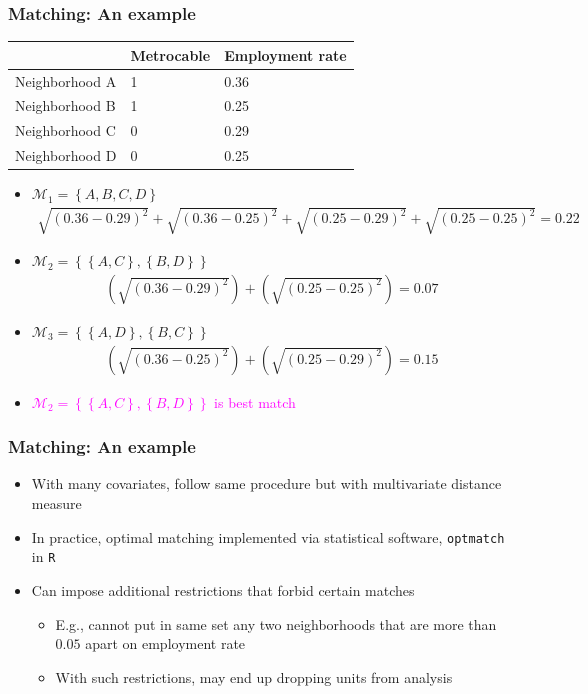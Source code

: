\documentclass[table, xcolor = {dvipsnames}, 9pt]{beamer}
\theoremstyle{plain}
\begin{document}
\begin{frame}[t]
\frametitle{Matching: An example}
\vfill
\begin{table}[H]
\centering
\begin{tabular}{lll}
\hline
& Metrocable & Employment rate \\ \hline
Neighborhood A  & 1  & 0.36 \\
Neighborhood B  & 1  & 0.25 \\
Neighborhood C  & 0  & 0.29 \\
Neighborhood D  & 0  & 0.25 \\
\hline
\end{tabular}
\end{table} \vfill
\begin{itemize}
\item $\mathcal{M}_1 = \left\{A, B, C, D\right\}$ \vfill
\footnotesize
\begin{align*}
\sqrt{\left(0.36 - 0.29\right)^2} + \sqrt{\left(0.36 - 0.25\right)^2} + \sqrt{\left(0.25 - 0.29\right)^2} + \sqrt{\left(0.25 - 0.25\right)^2} = 0.22
\end{align*} \vfill
\normalsize
\item $\mathcal{M}_2 = \left\{\left\{A, C\right\}, \left\{B, D\right\}\right\}$ \vfill
\footnotesize
\begin{align*}
\left(\sqrt{\left(0.36 - 0.29\right)^2}\right) + \left(\sqrt{\left(0.25 - 0.25\right)^2}\right) = 0.07
\end{align*} \vfill
\normalsize
\item $\mathcal{M}_3 = \left\{\left\{A, D\right\}, \left\{B, C\right\} \right\}$ \vfill
\footnotesize
\begin{align*}
\left(\sqrt{\left(0.36 - 0.25\right)^2}\right) + \left(\sqrt{\left(0.25 - 0.29\right)^2}\right) = 0.15
\end{align*} \vfill
\normalsize
\item[] \vfill 
\textcolor{magenta}{$\mathcal{M}_2 = \left\{\left\{A, C\right\}, \left\{B, D\right\}\right\}$ is best match} \vfill
\end{itemize} \vfill
\end{frame}
\begin{frame}[t]
\frametitle{Matching: An example}
\vfill
\begin{itemize}
\item With many covariates, follow same procedure but with multivariate distance measure \vfill
\item In practice, optimal matching implemented via statistical software, \texttt{optmatch} in \texttt{R} \vfill
\item Can impose additional restrictions that forbid certain matches \vfill
\begin{itemize} \vfill
\item E.g., cannot put in same set any two neighborhoods that are more than $0.05$ apart on employment rate \vfill
\item With such restrictions, may end up dropping units from analysis \vfill
\end{itemize} \vfill
\end{itemize} \vfill
\end{frame}
\end{document}
